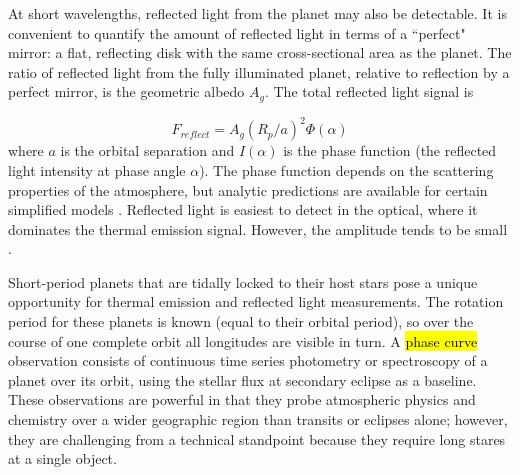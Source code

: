 \documentclass[graybox,natbib,nosecnum]{svmult}
\newcommand{\hbindex}[1]{\hl{#1}\index{#1}}  %
\begin{document}

At short wavelengths, reflected light from the planet may also be detectable. It is convenient to quantify the amount of reflected light in terms of a ``perfect" mirror: a flat, reflecting disk with the same cross-sectional area as the planet. The ratio of reflected light from the fully illuminated planet, relative to reflection by a perfect mirror, is the geometric albedo $A_g$. The total reflected light signal is

\begin{equation}
F_{reflect} = A_g(R_p/a)^2 \Phi(\alpha)
\end{equation}
where $a$ is the orbital separation and $I(\alpha)$ is the phase function (the reflected light intensity at phase angle $\alpha$). The phase function depends on the scattering properties of the atmosphere, but analytic predictions are available for certain simplified models \citep[e.g.][]{madhu12}.  Reflected light is easiest to detect in the optical, where it dominates the thermal emission signal. However, the amplitude tends to be small \citep[typically less than 100 ppm][]{angerhausen15}.

Short-period planets that are tidally locked to their host stars pose a unique opportunity for thermal emission and reflected light measurements. The rotation period for these planets is known (equal to their orbital period), so over the course of one complete orbit all longitudes are visible in turn. A \hbindex{phase curve} observation consists of continuous time series photometry or spectroscopy of a planet over its orbit, using the stellar flux at secondary eclipse as a baseline. These observations are powerful in that they probe atmospheric physics and chemistry over a wider geographic region than transits or eclipses alone; however, they are challenging from a technical standpoint because they require long stares at a single object. %
\end{document}

